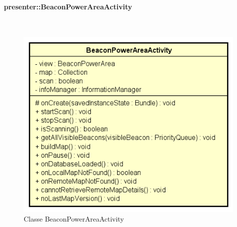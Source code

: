 \documentclass[../DefinizioneDiProdotto.tex]{subfiles}
\begin{document}
\paragraph{presenter::BeaconPowerAreaActivity}
\
\begin{figure}[H]
	\centering
	\includegraphics[width=\maxwidth]{img/BeaconPowerAreaActivity.png}
	\caption{Classe BeaconPowerAreaActivity}\label{fig:presenter::BeaconPowerAreaActivity} 
\end{figure}
\end{document}
